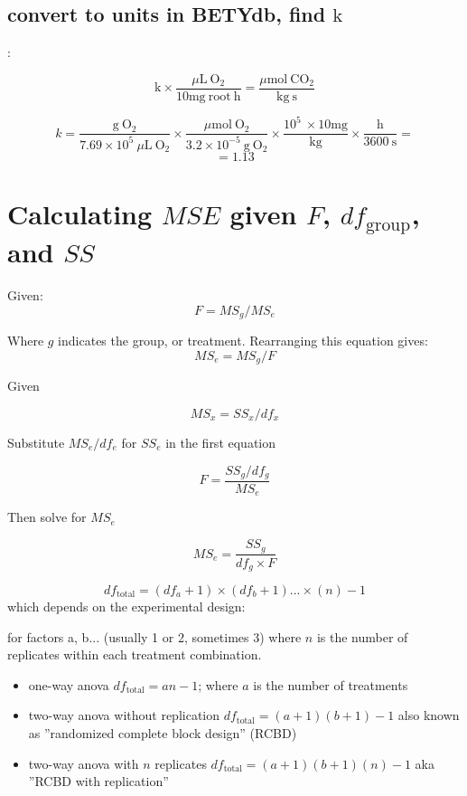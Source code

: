 \documentclass[12pt,english,portrait]{article}
\begin{document}
\subsection{convert to units in BETYdb, find $\textrm{k}$}:


$$\textrm{k}\times\frac{\mu\mathrm{L}\ \textrm{O}_2}{10\mathrm{mg}\ \mathrm{root}\ \mathrm{h}} = \frac{\mu\mathrm{mol}\ \mathrm{CO}_2}{\mathrm{kg}\ \mathrm{s}}$$


$$k =  \frac{\mathrm{g}\ \mathrm{O}_2}{7.69\times10^5\ \mu\mathrm{L}\ \mathrm{O}_2}\times\frac{\mu\mathrm{mol}\ \mathrm{O}_2}{3.2 \times 10^{-5}\ \mathrm{g}\ \mathrm{O}_2} \times \frac{10^5\ \times 10\mathrm{mg}}{\mathrm{kg}} \times \frac{\mathrm{h}}{3600\ \mathrm{s}}= $$ 
$$= 1.13$$



\section{Calculating  $MSE$ given $F$, $df_{\text{group}}$, and $SS$}

Given:
\begin{equation}\label{eq:f}
  F = MS_g/MS_e
\end{equation}


Where $g$ indicates the group, or treatment. 
Rearranging this equation gives:
$$MS_e=MS_g/F$$

Given

$$MS_x = SS_x/df_x$$

Substitute $MS_e/df_e$ for $SS_e$ in the first equation

$$F=\frac{SS_g/df_g}{MS_e}$$

Then solve for $MS_e$

\begin{equation}\label{eq:mse}
  MS_e = \frac{SS_g}{df_g\times F}
\end{equation}

\begin{equation}\label{eq:dft}
  df_{\text{total}}=(df_a+1)\times(df_b+1)...\times(n)-1
\end{equation}
which depends on the experimental design:

for factors a, b... (usually 1 or 2, sometimes 3) where $n$ is the number of replicates within each treatment combination.

\begin{itemize}
\item  one-way anova $df_{\text{total}}=an-1$; where $a$ is the number of treatments 
\item two-way anova without replication $df_{\text{total}}=(a+1)(b+1)-1$ also known as ''randomized complete block design'' (RCBD)
\item two-way anova with $n$ replicates $df_{\text{total}}=(a+1)(b+1)(n)-1$ aka ''RCBD with replication''
\end{itemize}
\end{document}
